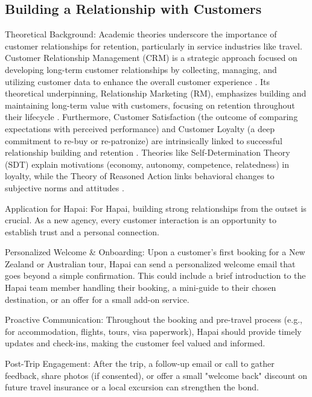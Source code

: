 \documentclass{article}
\begin{document}
\subsection{Building a Relationship with Customers}

Theoretical Background:
Academic theories underscore the importance of customer relationships for retention, particularly in service industries like travel. Customer Relationship Management (CRM) is a strategic approach focused on developing long-term customer relationships by collecting, managing, and utilizing customer data to enhance the overall customer experience \cite{ledro_artificial_2022}. Its theoretical underpinning, Relationship Marketing (RM), emphasizes building and maintaining long-term value with customers, focusing on retention throughout their lifecycle \cite{petzer_customer_2009}. Furthermore, Customer Satisfaction (the outcome of comparing expectations with perceived performance) and Customer Loyalty (a deep commitment to re-buy or re-patronize) are intrinsically linked to successful relationship building and retention \cite{komalasari_customer_2018}. Theories like Self-Determination Theory (SDT) explain motivations (economy, autonomy, competence, relatedness) in loyalty, while the Theory of Reasoned Action links behavioral changes to subjective norms and attitudes \cite{wang_exploring_nodate}.

Application for Hapai:
For Hapai, building strong relationships from the outset is crucial. As a new agency, every customer interaction is an opportunity to establish trust and a personal connection.

Personalized Welcome \& Onboarding: Upon a customer's first booking for a New Zealand or Australian tour, Hapai can send a personalized welcome email that goes beyond a simple confirmation. This could include a brief introduction to the Hapai team member handling their booking, a mini-guide to their chosen destination, or an offer for a small add-on service.

Proactive Communication: Throughout the booking and pre-travel process (e.g., for accommodation, flights, tours, visa paperwork), Hapai should provide timely updates and check-ins, making the customer feel valued and informed.

Post-Trip Engagement: After the trip, a follow-up email or call to gather feedback, share photos (if consented), or offer a small "welcome back" discount on future travel insurance or a local excursion can strengthen the bond.
\end{document}

